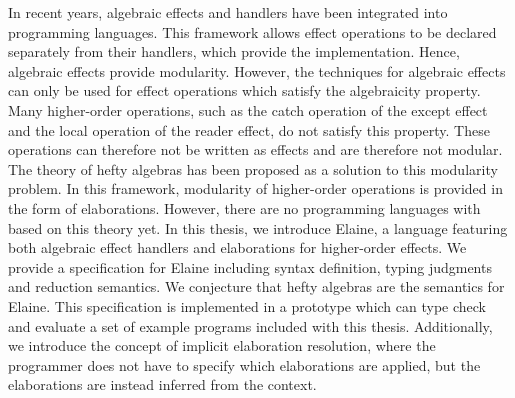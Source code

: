 \noindent In recent years, algebraic effects and handlers have been integrated into programming languages. This framework allows effect operations to be declared separately from their handlers, which provide the implementation. Hence, algebraic effects provide modularity. However, the techniques for algebraic effects can only be used for effect operations which satisfy the algebraicity property. Many higher-order operations, such as the catch operation of the except effect and the local operation of the reader effect, do not satisfy this property. These operations can therefore not be written as effects and are therefore not modular. The theory of hefty algebras has been proposed as a solution to this modularity problem. In this framework, modularity of higher-order operations is provided in the form of elaborations. However, there are no programming languages with based on this theory yet. In this thesis, we introduce Elaine, a language featuring both algebraic effect handlers and elaborations for higher-order effects. We provide a specification for Elaine including syntax definition, typing judgments and reduction semantics. We conjecture that hefty algebras are the semantics for Elaine. This specification is implemented in a prototype which can type check and evaluate a set of example programs included with this thesis. Additionally, we introduce the concept of implicit elaboration resolution, where the programmer does not have to specify which elaborations are applied, but the elaborations are instead inferred from the context.
